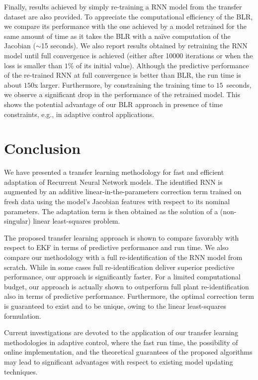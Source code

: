 \documentclass{article}
\begin{document}
Finally,  results achieved by  simply re-training a RNN model from the transfer dataset are also provided.  To appreciate the computational efficiency of the BLR, we compare its performance with  the one achieved by a model retrained for the same amount of time as it takes the BLR with a  na{\"i}ve  computation of the Jacobian  ($\sim$15 seconds). We also report results obtained by retraining the RNN model until full convergence is achieved (either after 10000 iterations or when the loss is smaller than $1$\% of its initial value). Although the predictive performance of the re-trained RNN at full convergence is better than BLR, the run time is about $150$x larger. Furthermore, by constraining the training time to $15$~seconds, we observe a significant drop in the performance of the retrained model. This shows the potential advantage of our BLR approach in presence of time constraints, e.g., in adaptive control applications.  



\section{Conclusion}
\label{sec:conclusion}
We have presented a transfer learning methodology for fast and efficient adaptation of Recurrent Neural Network 
models. The identified RNN is augmented by an additive linear-in-the-parameters correction term trained on fresh data using the model's Jacobian features with respect to its nominal parameters. 
The adaptation term is then obtained as the solution of a (non-singular) linear least-squares problem.

The proposed transfer learning approach is shown to compare favorably with respect to EKF in terms of predictive performance and run time. We also compare our methodology with a full   re-identification of the RNN model from scratch. While in some cases full re-identification deliver superior predictive performance, our approach is significantly faster. For a limited computational budget, our approach is actually shown to outperform full plant re-identification also in terms of predictive performance. 
Furthermore, the optimal correction term is guaranteed to exist and to be unique, owing to the linear least-squares formulation.

Current investigations are devoted to the application of our transfer learning methodologies in adaptive control, where the fast run time, the possibility of online implementation, and the theoretical guarantees of the  proposed algorithms may lead to significant advantages with respect to existing model updating techniques.
\end{document}
